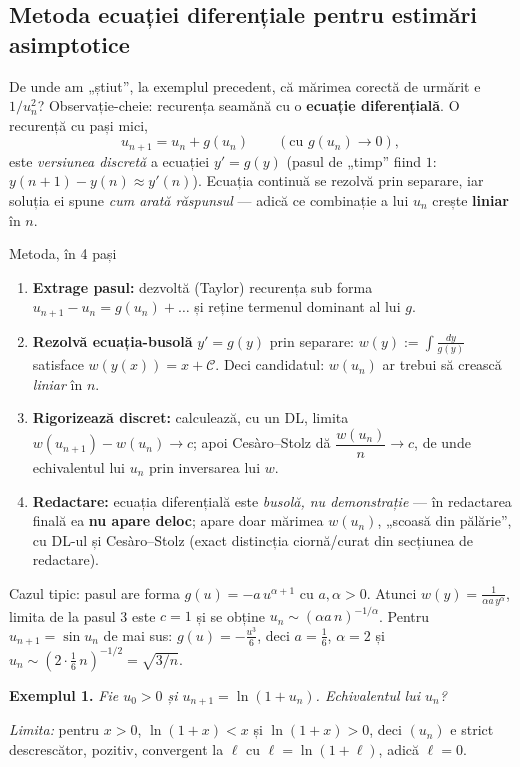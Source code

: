 \subsection{Metoda ecuației diferențiale pentru estimări asimptotice}

De unde am „știut'', la exemplul precedent, că mărimea corectă de urmărit e $1/u_n^2$? Observație-cheie: recurența seamănă cu o \textbf{ecuație diferențială}. O recurență cu pași mici,
\[
u_{n+1}=u_n+g(u_n)\qquad(\text{cu } g(u_n)\to0),
\]
este \emph{versiunea discretă} a ecuației $y'=g(y)$ (pasul de „timp'' fiind $1$: $y(n+1)-y(n)\approx y'(n)$). Ecuația continuă se rezolvă prin separare, iar soluția ei spune \emph{cum arată răspunsul} --- adică ce combinație a lui $u_n$ crește \textbf{liniar} în $n$.

\begin{tehbox}{Metoda, în 4 pași}
\begin{enumerate}[leftmargin=*, itemsep=1pt]
\item \textbf{Extrage pasul:} dezvoltă (Taylor) recurența sub forma $u_{n+1}-u_n=g(u_n)+\dots$ și reține termenul dominant al lui $g$.
\item \textbf{Rezolvă ecuația-busolă} $y'=g(y)$ prin separare: $\displaystyle w(y):=\int\frac{dy}{g(y)}$ satisface $w(y(x))=x+\mathcal C$. Deci candidatul: $w(u_n)$ ar trebui să crească \emph{liniar} în $n$.
\item \textbf{Rigorizează discret:} calculează, cu un DL, limita $w(u_{n+1})-w(u_n)\to c$; apoi Cesàro--Stolz dă $\dfrac{w(u_n)}{n}\to c$, de unde echivalentul lui $u_n$ prin inversarea lui $w$.
\item \textbf{Redactare:} ecuația diferențială este \emph{busolă, nu demonstrație} --- în redactarea finală ea \textbf{nu apare deloc}; apare doar mărimea $w(u_n)$, „scoasă din pălărie'', cu DL-ul și Cesàro--Stolz (exact distincția ciornă/curat din secțiunea de redactare).
\end{enumerate}
Cazul tipic: pasul are forma $g(u)=-a\,u^{\alpha+1}$ cu $a,\alpha>0$. Atunci $w(y)=\frac{1}{\alpha a\,y^{\alpha}}$, limita de la pasul 3 este $c=1$ și se obține $u_n\sim(\alpha a\,n)^{-1/\alpha}$. Pentru $u_{n+1}=\sin u_n$ de mai sus: $g(u)=-\frac{u^3}{6}$, deci $a=\frac16$, $\alpha=2$ și $u_n\sim(2\cdot\frac16\,n)^{-1/2}=\sqrt{3/n}$. \checkmark
\end{tehbox}

\textbf{Exemplul 1.} \emph{Fie $u_0>0$ și $u_{n+1}=\ln(1+u_n)$. Echivalentul lui $u_n$?}

\emph{Limita:} pentru $x>0$, $\ln(1+x)<x$ și $\ln(1+x)>0$, deci $(u_n)$ e strict descrescător, pozitiv, convergent la $\ell$ cu $\ell=\ln(1+\ell)$, adică $\ell=0$.

